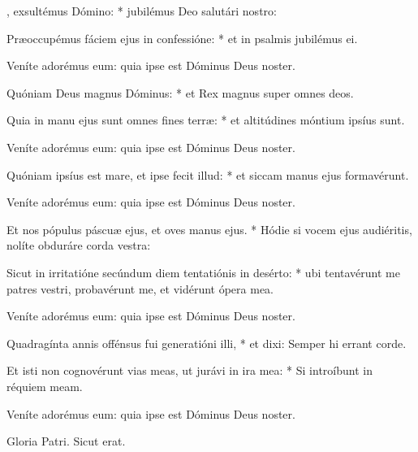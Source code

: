 \begin{psalmus}

    , exsultémus Dómino: * jubilémus Deo salutári nostro:

    Præoccupémus fáciem ejus in confessióne: * et in psalmis jubilémus ei.

\end{psalmus}

 Veníte adorémus eum: quia ipse est Dóminus Deus noster.

\begin{psalmus}

    Quóniam Deus magnus Dóminus: * et Rex magnus super omnes deos.

    Quia in manu ejus sunt omnes fines terræ: * et altitúdines móntium ipsíus sunt.

\end{psalmus}

 Veníte adorémus eum: quia ipse est Dóminus Deus noster.
    
\begin{psalmus}

    Quóniam ipsíus est mare, et ipse fecit illud: * et siccam manus ejus formavérunt.

\end{psalmus}
    
 Veníte adorémus eum: quia ipse est Dóminus Deus noster.
  
\begin{psalmus}

    Et nos pópulus páscuæ ejus, et oves manus ejus. * Hódie si vocem ejus audiéritis, nolíte obduráre corda vestra:
    
    Sicut in irritatióne secúndum diem tentatiónis in desérto: * ubi tentavérunt me patres vestri, probavérunt me, et vidérunt ópera mea.

\end{psalmus}

 Veníte adorémus eum: quia ipse est Dóminus Deus noster.

\begin{psalmus}
    
    Quadragínta annis offénsus fui generatióni illi, * et dixi: Semper hi errant corde.

    Et isti non cognovérunt vias meas, ut jurávi in ira mea: * Si introíbunt in réquiem meam.

\end{psalmus}

 Veníte adorémus eum: quia ipse est Dóminus Deus noster.

\begin{psalmus}

    Gloria Patri. Sicut erat.
    
\end{psalmus}

